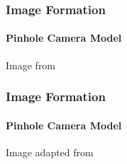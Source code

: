 \documentclass[xetex,professionalfont]{beamer}
\begin{document}

\begin{frame}
\frametitle{Image Formation}
\framesubtitle{Pinhole Camera Model}

\bigskip
\begin{center}
    {\centering Image from \cite{szeliski2010}}
\end{center}

\end{frame}


\begin{frame}
\frametitle{Image Formation}
\framesubtitle{Pinhole Camera Model}

\bigskip
\begin{center}
    {\centering Image adapted from \cite{prince12}}
\end{center}

\end{frame}

\end{document}
